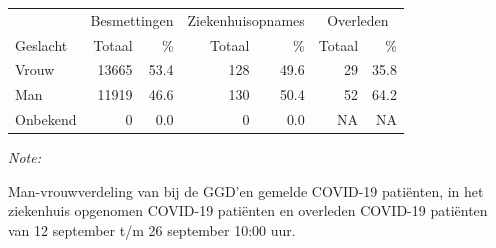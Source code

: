 \documentclass[
  english,
  man,floatsintext]{apa6}
\begin{document}
\begin{table}
\centering\begingroup\fontsize{11}{13}\selectfont

\begin{threeparttable}
\begin{tabular}{lrrrrrr}
\toprule
\multicolumn{1}{c}{ } & \multicolumn{2}{c}{Besmettingen} & \multicolumn{2}{c}{Ziekenhuisopnames} & \multicolumn{2}{c}{Overleden} \\
\cmidrule(l{3pt}r{3pt}){2-3} \cmidrule(l{3pt}r{3pt}){4-5} \cmidrule(l{3pt}r{3pt}){6-7}
Geslacht & Totaal & \% & Totaal & \% & Totaal & \%\\
\midrule
Vrouw & 13665 & 53.4 & 128 & 49.6 & 29 & 35.8\\
Man & 11919 & 46.6 & 130 & 50.4 & 52 & 64.2\\
Onbekend & 0 & 0.0 & 0 & 0.0 & NA & NA\\
\bottomrule
\end{tabular}
\begin{tablenotes}
\item \textit{Note: } 
\item Man-vrouwverdeling van bij de GGD’en gemelde COVID-19 patiënten, in het ziekenhuis opgenomen COVID-19 patiënten en overleden COVID-19 patiënten van 12 september t/m 26 september 10:00 uur.
\end{tablenotes}
\end{threeparttable}
\endgroup{}
\end{table}
\newpage
\end{document}
